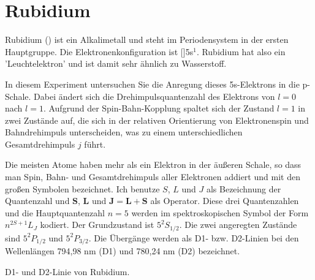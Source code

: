  \auftraege

\nocite{Hertel2015,Meschede,DemtL1,DemtL2,Gert,Dem3,Dem4}

\section{Rubidium}
	

Rubidium () ist ein Alkalimetall und steht im Periodensystem in der ersten Hauptgruppe. Die Elektronenkonfiguration ist []5s$^1$. Rubidium hat also ein 'Leuchtelektron' und ist damit sehr ähnlich zu  Wasserstoff. 


In diesem Experiment untersuchen Sie die Anregung dieses 5s-Elektrons in die p-Schale. Dabei ändert sich die Drehimpulsquantenzahl des Elektrons von $l=0$ nach $l=1$. Aufgrund der Spin-Bahn-Kopplung spaltet sich der Zustand $l=1$ in zwei Zustände auf, die sich in der relativen Orientierung von Elektronenspin und Bahndrehimpuls unterscheiden, was zu einem unterschiedlichen Gesamtdrehimpuls $j$ führt.

Die meisten Atome haben mehr als ein Elektron in der äußeren Schale, so dass man Spin, Bahn- und Gesamtdrehimpuls aller Elektronen addiert und mit den großen Symbolen bezeichnet. Ich benutze $S$, $L$ und $J$ als Bezeichnung der Quantenzahl und 
$\mathbf{S}$, $\mathbf{L}$ und $\mathbf{J} = \mathbf{L} + \mathbf{S}$ als Operator. Diese drei Quantenzahlen und die Hauptquantenzahl $n=5$ werden im spektroskopischen Symbol der Form $n^{2S+1}L_J$ kodiert. Der Grundzustand ist $5^2S_{1/2}$. Die zwei angeregten Zustände sind $5^2P_{1/2}$ und $5^2P_{3/2}$. Die Übergänge werden als D1- bzw. D2-Linien bei den Wellenlängen 794,98 nm (D1) und 780,24 nm (D2) bezeichnet.

\begin{marginfigure}
	\caption{D1- und D2-Linie von Rubidium.}	
	\label{D-Linie}
\end{marginfigure}

